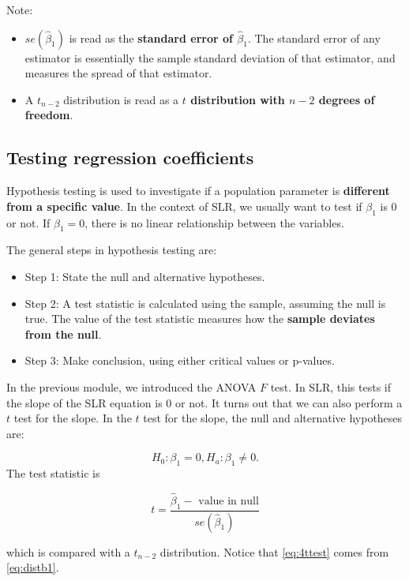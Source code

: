 \documentclass[
]{book}
\providecommand{\tightlist}{%
  \setlength{\itemsep}{0pt}\setlength{\parskip}{0pt}}
\begin{document}
Note:

\begin{itemize}
\item
  \(se(\hat{\beta}_1)\) is read as the \textbf{standard error of \(\hat{\beta}_1\)}. The standard error of any estimator is essentially the sample standard deviation of that estimator, and measures the spread of that estimator.
\item
  A \(t_{n-2}\) distribution is read as a \textbf{\(t\) distribution with \(n-2\) degrees of freedom}.
\end{itemize}

\subsection{Testing regression coefficients}\label{testing-regression-coefficients}

Hypothesis testing is used to investigate if a population parameter is \textbf{different from a specific value}. In the context of SLR, we usually want to test if \(\beta_1\) is 0 or not. If \(\beta_1 = 0\), there is no linear relationship between the variables.

The general steps in hypothesis testing are:

\begin{itemize}
\tightlist
\item
  Step 1: State the null and alternative hypotheses.
\item
  Step 2: A test statistic is calculated using the sample, assuming the null is true. The value of the test statistic measures how the \textbf{sample deviates from the null}.
\item
  Step 3: Make conclusion, using either critical values or p-values.
\end{itemize}

In the previous module, we introduced the ANOVA \(F\) test. In SLR, this tests if the slope of the SLR equation is 0 or not. It turns out that we can also perform a \(t\) test for the slope. In the \(t\) test for the slope, the null and alternative hypotheses are:

\[
H_0: \beta_1 = 0, H_a: \beta_1 \neq 0.
\]
The test statistic is

\begin{equation} 
t = \frac{\hat{\beta}_1 - \text{ value in null}}{se(\hat{\beta}_1)}
\label{eq:4ttest}
\end{equation}

which is compared with a \(t_{n-2}\) distribution. Notice that \eqref{eq:4ttest} comes from \eqref{eq:distb1}.
\end{document}
